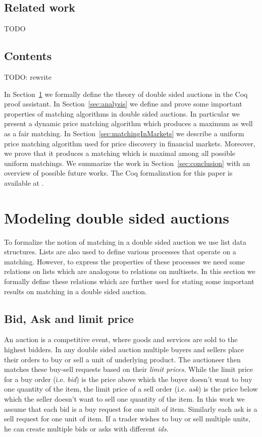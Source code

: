 \documentclass[a4paper,UKenglish,cleveref, autoref]{lipics-v2019}
\begin{document}
\subsection{Related work}

TODO

\subsection{Contents}
TODO: rewrite

In Section~\ref{sec:modeling} we formally define the theory of double sided auctions in the Coq proof assistant. In Section~\ref{sec:analysis} we define and prove some important properties of matching algorithms in double sided auctions. In particular we present a dynamic price matching algorithm which produces a maximum as well as a fair matching. In Section~\ref{sec:matchingInMarkets} we describe a uniform price matching algorithm used for price discovery in financial markets. Moreover, we prove that it produces a matching which is maximal among all possible uniform matchings. We summarize the work in Section~\ref{sec:conclusion} with an overview of possible future works. The Coq formalization for this paper is available at \cite{auctiongithub}.  

\section{Modeling double sided auctions}\label{sec:modeling}
To formalize the notion of matching in a double sided auction we use  list data structures.  Lists are also used to define various processes that operate on  a matching. However, to express the properties of these processes we need some  relations on lists which are analogous to  relations on multisets. In this section we formally define these relations which are further used for stating some important results on matching in a double sided auction.

\subsection{Bid, Ask and limit price}
An auction is a  competitive event, where goods and services are sold to the highest bidders. In  any double sided auction multiple buyers and sellers place their orders to buy or sell a unit of underlying product. The  auctioneer then matches these buy-sell requests  based on their \emph{limit prices}. While the limit price for a buy order (i.e. \emph{bid}) is the price above which the buyer doesn't want to buy one quantity of the item, the limit price of a sell order (i.e. \emph{ask}) is the price below which the seller doesn't want to sell one quantity of the item.  In this work we assume that each bid is a buy request for one unit of item. Similarly each ask is a sell request for one unit of item. If a trader wishes to buy or sell multiple units, he can create multiple bids or asks with different \emph{ids}. 
\end{document}
